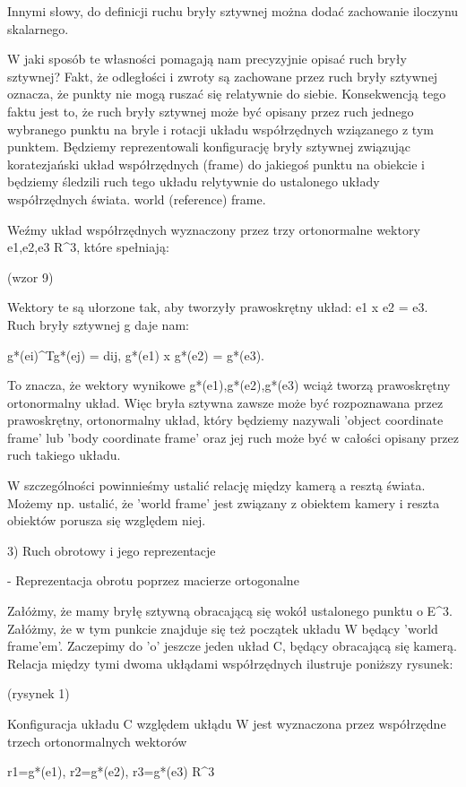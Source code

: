 Innymi słowy, do definicji ruchu bryły sztywnej można dodać zachowanie iloczynu skalarnego.

W jaki sposób te własności pomagają nam precyzyjnie opisać ruch bryły sztywnej? Fakt, że odległości i zwroty są zachowane przez ruch bryły sztywnej oznacza, że punkty nie mogą ruszać się relatywnie do siebie. Konsekwencją tego faktu jest to, że ruch bryły sztywnej może być opisany przez ruch jednego wybranego punktu na bryle i rotacji układu współrzędnych wziązanego z tym punktem. Będziemy reprezentowali konfigurację bryły sztywnej związując koratezjański układ współrzędnych (frame) do jakiegoś punktu na obiekcie i będziemy śledzili ruch tego układu relytywnie do ustalonego układy współrzędnych świata. world (reference) frame.

Weźmy układ współrzędnych wyznaczony przez trzy ortonormalne wektory e1,e2,e3 \in R^3, które spełniają:

(wzor 9)

Wektory te są ułorzone tak, aby tworzyły prawoskrętny układ: e1 x e2 = e3. Ruch bryły sztywnej g daje nam:

g*(ei)^Tg*(ej) = dij, g*(e1) x g*(e2) = g*(e3).

To znacza, że wektory wynikowe g*(e1),g*(e2),g*(e3) wciąż tworzą prawoskrętny ortonormalny układ. Więc bryła sztywna zawsze może być rozpoznawana przez prawoskrętny, ortonormalny układ, który będziemy nazywali 'object coordinate frame' lub 'body coordinate frame' oraz jej ruch może być w całości opisany przez ruch takiego układu.

W szczególności powinnieśmy ustalić relację między kamerą a resztą świata. Możemy np. ustalić, że 'world frame' jest związany z obiektem kamery i reszta obiektów porusza się względem niej.

3) Ruch obrotowy i jego reprezentacje

- Reprezentacja obrotu poprzez macierze ortogonalne

Załóżmy, że mamy bryłę sztywną obracającą się wokół ustalonego punktu o \in E^3. Załóżmy, że w tym punkcie znajduje się też początek układu W będący 'world frame'em'. Zaczepimy do 'o' jeszcze jeden układ C, będący obracającą się kamerą. Relacja między tymi dwoma ukłądami współrzędnych ilustruje poniższy rysunek:

(rysynek 1)

Konfiguracja układu C względem ukłądu W jest wyznaczona przez współrzędne trzech ortonormalnych wektorów 

r1=g*(e1), r2=g*(e2), r3=g*(e3) \in R^3

